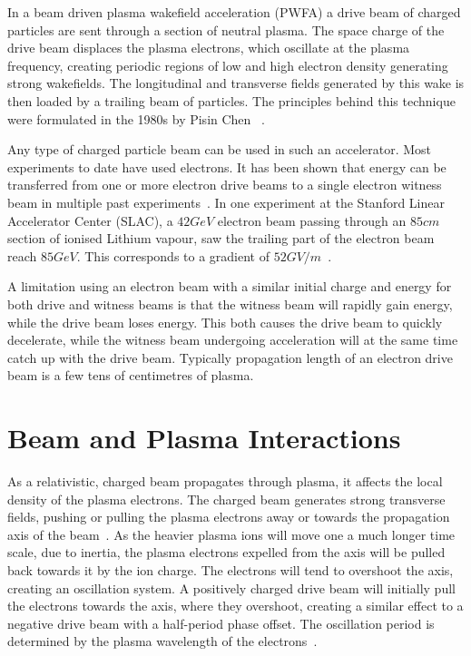 In a beam driven plasma wakefield acceleration (PWFA) a drive beam of charged particles are sent through a section of neutral plasma.
The space charge of the drive beam displaces the plasma electrons, which oscillate at the plasma frequency, creating periodic regions of low and high electron density generating strong wakefields.
The longitudinal and transverse fields generated by this wake is then loaded by a trailing beam of particles.
The principles behind this technique were formulated in the 1980s by Pisin Chen \etal~\cite{chen:1985}.

Any type of charged particle beam can be used in such an accelerator.
Most experiments to date have used electrons.
It has been shown that energy can be transferred from one or more electron drive beams to a single electron witness beam in multiple past experiments~\cite{rosenzweig:1988, blumenfeld:2007, kallos:2007, litos:2014, nakajima:1990}.
In one experiment at the Stanford Linear Accelerator Center (SLAC), a $42\unit{GeV}$ electron beam passing through an $85\unit{cm}$ section of ionised Lithium vapour, saw the trailing part of the electron beam reach $85\unit{GeV}$.
This corresponds to a gradient of $52\unit{GV/m}$~\cite{blumenfeld:2007}.

A limitation using an electron beam with a similar initial charge and energy for both drive and witness beams is that the witness beam will rapidly gain energy, while the drive beam loses energy.
This both causes the drive beam to quickly decelerate, while the witness beam undergoing acceleration will at the same time catch up with the drive beam.
Typically propagation length of an electron drive beam is a few tens of centimetres of plasma.

\section{Beam and Plasma Interactions}
\label{Int:BPI}

As a relativistic, charged beam propagates through plasma, it affects the local density of the plasma electrons.
The charged beam generates strong transverse fields, pushing or pulling the plasma electrons away or towards the propagation axis of the beam~\cite{lee:2001,adli:2016b}.
As the heavier plasma ions will move one a much longer time scale, due to inertia, the plasma electrons expelled from the axis will be pulled back towards it by the ion charge.
The electrons will tend to overshoot the axis, creating an oscillation system.
A positively charged drive beam will initially pull the electrons towards the axis, where they overshoot, creating a similar effect to a negative drive beam with a half-period phase offset.
The oscillation period is determined by the plasma wavelength of the electrons~\cite{hogan:2016,muggli:2017}. 

